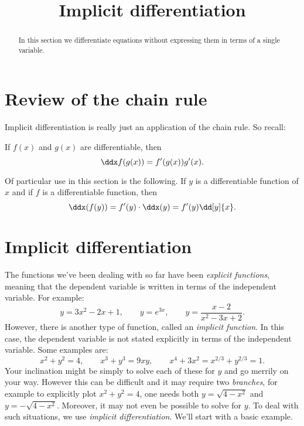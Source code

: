 \documentclass{ximera}
\title[Dig-In:]{Implicit differentiation}
\begin{document}
\begin{abstract}
In this section we differentiate equations without expressing them in
terms of a single variable.
\end{abstract}
\maketitle

\section{Review of the chain rule}

Implicit differentiation is really just an application of the chain rule.
So recall:

\begin{theorem}
If $f(x)$ and $g(x)$ are differentiable, then
\[
\ddx f(g(x)) = f'(g(x))g'(x).
\]
\end{theorem}

Of particular use in this section is the following.  
If $y$ is a differentiable function of $x$ and if $f$ is a differentiable function, then
\[
\ddx (f(y)) = f'(y) \cdot \ddx (y) = f'(y) \dd[y]{x}.
\]

\section{Implicit differentiation}

The functions we've been dealing with so far have been
\textit{explicit functions}, meaning that the
dependent variable is written in terms of the independent
variable. For example:
\[
y=3x^2-2x+1,\qquad y=e^{3x}, \qquad y = \frac{x-2}{x^2-3x+2}.
\]
However, there is another type of function, called an \textit{implicit
  function}. In this case, the dependent variable is not stated
explicitly in terms of the independent variable. Some examples are:
\[
x^2+y^2 = 4,\qquad x^3+y^3 = 9xy, \qquad x^4+3x^2 = x^{2/3}+y^{2/3} = 1.
\]
Your inclination might be simply to solve each of these for $y$ and go
merrily on your way. However this can be difficult and it may require
two \textit{branches}, for example to explicitly plot $x^2+y^2 = 4$,
one needs both $y= \sqrt{4-x^2}$ and $y=-\sqrt{4-x^2}$. Moreover, it
may not even be possible to solve for $y$. To deal with such
situations, we use \textit{implicit
  differentiation}. We'll start with a basic example.
\end{document}
